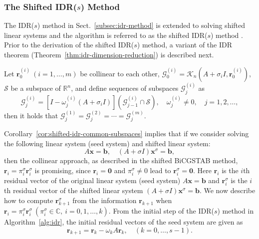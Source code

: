 \subsubsection{{The Shifted IDR($s$) Method}}\label{subsec:shifted-idr}
{The IDR($s$) method in Sect.\ \ref{subsec:idr-method} is extended to solving shifted linear systems and the algorithm is referred to as the shifted IDR($s$) method . Prior to the derivation of the shifted IDR($s$) method, a variant of the IDR theorem (Theorem\ \ref{thm:idr-dimension-reduction}) is described next.}
\par{}
\begin{Corollary}[\BookCite{48}]\label{cor:shifted-idr-common-subspaces}
{Let $\bm r_0^{(i)}\ (i=1,\ldots,m)$ be collinear to each other, $\mathcal G_0^{(i)}=\mathcal K_n(A+\sigma_i I,\bm r_0^{(i)})$, $\mathcal S$ be a subspace of $\mathbb R^n$, and define sequences of subspaces $\mathcal G_j^{(i)}$ as}
\[\mathcal G_j^{(i)}=[I-\omega_j^{(i)}(A+\sigma_i I)](\mathcal G_{j-1}^{(i)}\cap\mathcal S),\quad\omega_j^{(i)}\ne0,\quad j=1,2,\ldots,\]
{then it holds that $\mathcal G_j^{(1)}=\mathcal G_j^{(2)}=\cdots=\mathcal G_j^{(m)}$.}
\end{Corollary}
{Corollary\ \ref{cor:shifted-idr-common-subspaces} implies that if we consider solving the following linear system (seed system) and shifted linear system:}
\[A\bm x=\bm b,\quad(A+\sigma I)\bm x^{\sigma}=\bm b,\]
{then the collinear approach, as described in the shifted BiCGSTAB method, $\bm r_i=\pi_i^{\sigma}\bm r_i^{\sigma}$ is promising, since $\bm r_i=\bm0$ and $\pi_i^{\sigma}\ne0$ lead to $\bm r_i^{\sigma}=\bm0$. Here $\bm r_i$ is the $i$th residual vector of the original linear system (seed system) $A\bm x=\bm b$ and $\bm r_i^{\sigma}$ is the $i$th residual vector of the shifted linear system $(A+\sigma I)\bm x^{\sigma}=\bm b$. We now describe how to compute $\bm r_{k+1}^{\sigma}$ from the information $\bm r_{k+1}$ when $\bm r_i=\pi_i^{\sigma}\bm r_i^{\sigma}\ (\pi_i^{\sigma}\in\mathbb C,\ i=0,1,\ldots,k)$.}
{From the initial step of the IDR($s$) method in Algorithm\ \ref{alg:idr}, the initial residual vectors of the seed system are given as}
\begin{equation}\label{eq:shifted-idr-seed-initial-residual}\bm r_{k+1}=\bm r_k-\omega_kA\bm r_k,\quad(k=0,\ldots,s-1).\end{equation}
